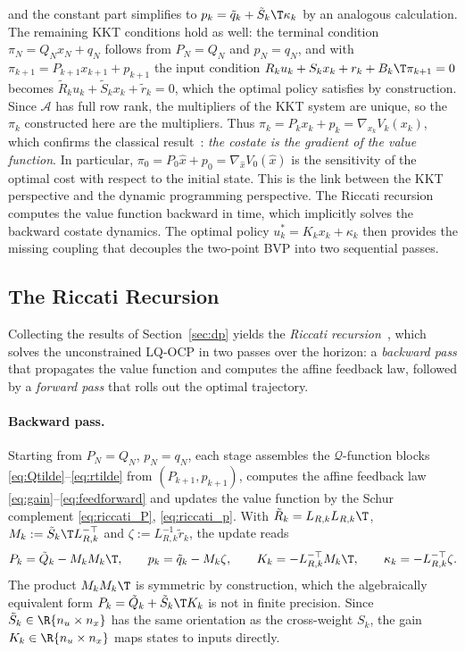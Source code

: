 and the constant part simplifies to $p_k = \tilde{q}_k + \tilde{S}_k\T \kappa_k$ by an analogous calculation.
The remaining KKT conditions hold as well: the terminal condition $\pi_N = Q_N x_N + q_N$ follows from $P_N = Q_N$ and $p_N = q_N$, and with $\pi_{k+1} = P_{k+1} x_{k+1} + p_{k+1}$ the input condition $R_k u_k + S_k x_k + r_k + B_k\T \pi_{k+1} = 0$ becomes $\tilde{R}_k u_k + \tilde{S}_k x_k + \tilde{r}_k = 0$, which the optimal policy satisfies by construction.
Since $\mathcal{A}$ has full row rank, the multipliers of the KKT system are unique, so the $\pi_k$ constructed here are the multipliers.
Thus $\pi_k = P_k x_k + p_k = \nabla_{x_k} V_k(x_k)$, which confirms the classical result~\cite{bryson1975applied}:
\textit{the costate is the gradient of the value function}.
In particular, $\pi_0 = P_0 \hat{x} + p_0 = \nabla_{\hat{x}} V_0(\hat{x})$ is the sensitivity of the optimal cost with respect to the initial state.
This is the link between the KKT perspective and the dynamic programming perspective.
The Riccati recursion computes the value function backward in time, which implicitly solves the backward costate dynamics.
The optimal policy $u_k^* = K_k x_k + \kappa_k$ then provides the missing coupling that decouples the two-point BVP into two sequential passes.

\subsection{The Riccati Recursion}
\label{sec:riccati}

Collecting the results of Section~\ref{sec:dp} yields the \textit{Riccati recursion}~\cite{frison2020hpipm,frison2015algorithms},
which solves the unconstrained LQ-OCP in two passes over the horizon: a \textit{backward pass} that propagates the value
function and computes the affine feedback law, followed by a \textit{forward pass}
that rolls out the optimal trajectory.

\paragraph{Backward pass.}
Starting from $P_N = Q_N$, $p_N = q_N$, each stage assembles the $\mathcal{Q}$-function blocks \eqref{eq:Qtilde}--\eqref{eq:rtilde} from $(P_{k+1}, p_{k+1})$,
computes the affine feedback law \eqref{eq:gain}--\eqref{eq:feedforward}
and updates the value function by the Schur complement \eqref{eq:riccati_P}, \eqref{eq:riccati_p}.
With $\tilde{R}_k = L_{R,k} L_{R,k}\T$, $M_k := \tilde{S}_k\T L_{R,k}^{-\top}$ and
$\zeta := L_{R,k}^{-1}\tilde{r}_k$, the update reads
\[
P_k = \tilde{Q}_k - M_k M_k\T, \qquad p_k = \tilde{q}_k - M_k\zeta, \qquad
K_k = -L_{R,k}^{-\top} M_k\T, \qquad \kappa_k = -L_{R,k}^{-\top}\zeta .
\]
The product $M_k M_k\T$ is symmetric by construction, which the algebraically
equivalent form $P_k = \tilde{Q}_k + \tilde{S}_k\T K_k$ is not in finite precision.
Since $\tilde{S}_k \in \R{n_u \times n_x}$ has the same orientation
as the cross-weight $S_k$, the gain $K_k \in \R{n_u \times n_x}$ maps states to
inputs directly.

